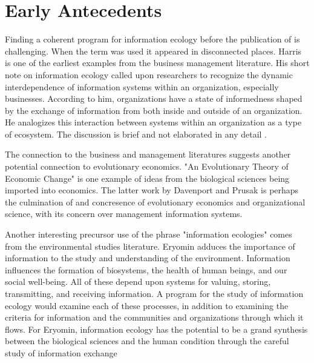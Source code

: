 \section{Early Antecedents}

Finding a coherent program for information ecology before the publication of \cite{nardi_information_1999, davenport_information_1997} is challenging. When the term was used it appeared in disconnected places. Harris is one of the earliest examples from the business management literature. His short note on information ecology called upon researchers to recognize the dynamic interdependence of information systems within an organization, especially businesses. According to him, organizations have a state of informedness shaped by the exchange of information from both inside and outside of an organization. He analogizes this interaction between systems within an organization as a type of ecosystem. The discussion is brief and not elaborated in any detail \cite{harris_information_1989}.

The connection to the business and management literatures suggests another potential connection to evolutionary economics. "An Evolutionary Theory of Economic Change" \cite{nelson_evolutionary_1985} is one example of ideas from the biological sciences being imported into economics. The latter work by Davenport and Prusak is perhaps the culmination of and concresence of evolutionary economics and organizational science, with its concern over management information systems.

Another interesting precursor use of the phrase "information ecologies" comes from the environmental studies literature. Eryomin adduces the importance of information to the study and understanding of the environment. Information influences the formation of biosystems, the health of human beings, and our social well-being. All of these depend upon systems for valuing, storing, transmitting, and receiving information. A program for the study of information ecology would examine each of these processes, in addition to examining the criteria for information and the communities and organizations through which it flows. For Eryomin, information ecology has the potential to be a grand synthesis between the biological sciences and the human condition through the careful study of information exchange \cite{eryomin_information_1998}